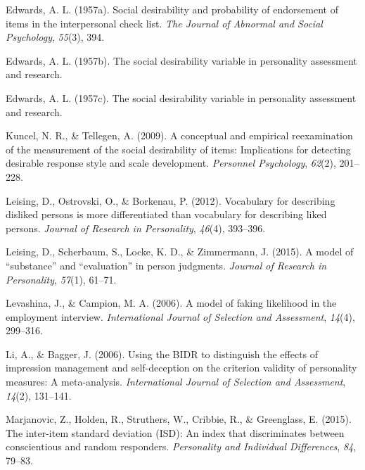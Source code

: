 \documentclass[
  english,
  ,jou]{apa6}
\begin{document}
\leavevmode\hypertarget{ref-edwards_social_1957-4}{}%
Edwards, A. L. (1957a). Social desirability and probability of endorsement of items in the interpersonal check list. \emph{The Journal of Abnormal and Social Psychology}, \emph{55}(3), 394.

\leavevmode\hypertarget{ref-edwards_social_1957}{}%
Edwards, A. L. (1957b). The social desirability variable in personality assessment and research.

\leavevmode\hypertarget{ref-edwards_social_1957-1}{}%
Edwards, A. L. (1957c). The social desirability variable in personality assessment and research.

\leavevmode\hypertarget{ref-kuncel_conceptual_2009}{}%
Kuncel, N. R., \& Tellegen, A. (2009). A conceptual and empirical reexamination of the measurement of the social desirability of items: Implications for detecting desirable response style and scale development. \emph{Personnel Psychology}, \emph{62}(2), 201--228.

\leavevmode\hypertarget{ref-leising_vocabulary_2012}{}%
Leising, D., Ostrovski, O., \& Borkenau, P. (2012). Vocabulary for describing disliked persons is more differentiated than vocabulary for describing liked persons. \emph{Journal of Research in Personality}, \emph{46}(4), 393--396.

\leavevmode\hypertarget{ref-leising_model_2015}{}%
Leising, D., Scherbaum, S., Locke, K. D., \& Zimmermann, J. (2015). A model of ``substance'' and ``evaluation'' in person judgments. \emph{Journal of Research in Personality}, \emph{57}(1), 61--71.

\leavevmode\hypertarget{ref-levashina_model_2006}{}%
Levashina, J., \& Campion, M. A. (2006). A model of faking likelihood in the employment interview. \emph{International Journal of Selection and Assessment}, \emph{14}(4), 299--316.

\leavevmode\hypertarget{ref-li_using_2006}{}%
Li, A., \& Bagger, J. (2006). Using the BIDR to distinguish the effects of impression management and self-deception on the criterion validity of personality measures: A meta-analysis. \emph{International Journal of Selection and Assessment}, \emph{14}(2), 131--141.

\leavevmode\hypertarget{ref-marjanovic_inter-item_2015}{}%
Marjanovic, Z., Holden, R., Struthers, W., Cribbie, R., \& Greenglass, E. (2015). The inter-item standard deviation (ISD): An index that discriminates between conscientious and random responders. \emph{Personality and Individual Differences}, \emph{84}, 79--83.
\end{document}
